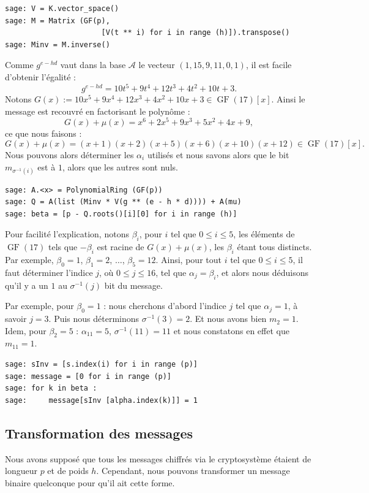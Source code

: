 \documentclass[a4paper, titlepage]{article}
\theoremstyle{definition}
\theoremstyle{remark}
\def\gf{\operatorname{GF}}
\begin{document}
\begin{verbatim}
sage: V = K.vector_space()
sage: M = Matrix (GF(p), 
                      [V(t ** i) for i in range (h)]).transpose()
sage: Minv = M.inverse()
\end{verbatim}
Comme $g^{e - hd}$ vaut dans la base $\mathcal{A}$ le vecteur $(1, 15, 9, 11, 0, 1)$, il est facile d'obtenir l'égalité : 
$$g^{e - hd} = 10t^5 + 9t^4 + 12t^3 + 4t^2 + 10t + 3.$$
Notons $G(x) := 10x^5 + 9x^4 + 12x^3 + 4x^2 + 10x + 3 \in \gf(17)[x]$.
Ainsi le message est recouvré en factorisant le polynôme :
$$G(x) + \mu(x) = x^6 + 2x^5 + 9x^3 + 5x^2 + 4x + 9,$$
ce que nous faisons : 
$$G(x) + \mu(x) = (x + 1)(x + 2)(x + 5)(x + 6)(x + 10)(x + 12)\in \gf(17)[x].$$ 
Nous pouvons alors déterminer les $\alpha_i$ utilisés et nous savons alors que le bit $m_{\sigma^{-1}(i)}$ est à $1$, alors que les autres sont nuls.
\begin{verbatim}
sage: A.<x> = PolynomialRing (GF(p))
sage: Q = A(list (Minv * V(g ** (e - h * d)))) + A(mu)
sage: beta = [p - Q.roots()[i][0] for i in range (h)]
\end{verbatim}
Pour facilité l'explication, notons $\beta_i$, pour $i$ tel que $0\leqslant i \leqslant 5$, les éléments de $\gf(17)$ tels que $-\beta_i$ est racine de $G(x) + \mu(x)$, les $\beta_i$ étant tous distincts. Par exemple, $\beta_0 = 1$, $\beta_1 =2$, $\dots$, $\beta_5 = 12$. Ainsi, pour tout $i$ tel que $0\leqslant i \leqslant 5$, il faut déterminer l'indice $j$, où $0 \leqslant j \leqslant 16$, tel que $\alpha_j = \beta_i$, et alors nous déduisons qu'il y a un $1$ au $\sigma^{-1}(j)$ bit du message.

Par exemple, pour $\beta_0 = 1$ : nous cherchons d'abord l'indice $j$ tel que $\alpha_j = 1$, à savoir $j = 3$. Puis nous déterminons $\sigma^{-1}(3) = 2$. Et nous avons bien $m_2 = 1$. Idem, pour $\beta_2 = 5$ : $\alpha_{11} = 5$, $\sigma^{-1}(11) = 11$ et nous constatons en effet que $m_{11} = 1$.
\begin{verbatim}
sage: sInv = [s.index(i) for i in range (p)]
sage: message = [0 for i in range (p)]
sage: for k in beta :
sage:     message[sInv [alpha.index(k)]] = 1
\end{verbatim}

\subsection{Transformation des messages}

Nous avons supposé que tous les messages chiffrés via le cryptosystème étaient de longueur $p$ et de poids $h$. Cependant, nous pouvons transformer un message binaire quelconque pour qu'il ait cette forme. 
\end{document}
